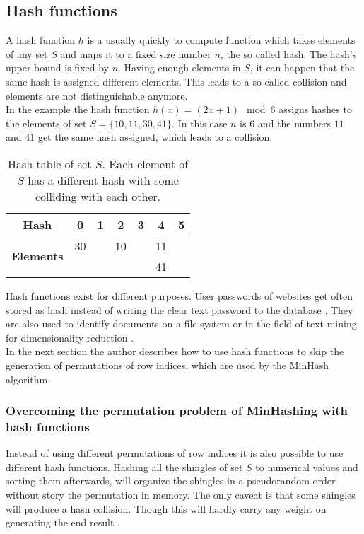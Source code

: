 \subsection{Hash functions}
A hash function $ h $ is a usually quickly to compute function which takes  elements of any set $ S $ and maps it to a fixed size number $ n $, the so called hash. The hash's upper bound is fixed by $ n $. Having enough elements in $ S $, it can happen that the same hash is assigned different elements. This leads to a so called collision and elements are not distinguishable anymore.\\


In the example the hash function $ h(x) = (2x+1) \mod 6 $ assigns hashes to the elements of set $ S = \{ 10,11,30,41 \} $.  In this case $ n $ is $ 6 $ and the numbers $ 11 $ and $ 41 $ get the same hash assigned, which leads to a collision.\\

\begin{table}[H]
    \centering
    \begin{tabular}{| c | c | c | c | c | c | c |}
        \hline
        \textbf{Hash} & \textbf{0} & \textbf{1} & \textbf{2} & \textbf{3} & \textbf{4} & \textbf{5}  \\
        \hline
        \multirow{2}{*}{\textbf{Elements}}   & 30 &    & 10 &    & 11 & \\
        &    &    &    &    & 41  &\\
        \hline
    \end{tabular}    
    \caption{Hash table of set $ S $. Each element of $ S $ has a different  hash with some colliding with each other.}
\end{table}

Hash functions exist for different purposes. User passwords of websites get often stored as hash instead of writing the clear text password to the database \cite{cryptographicHashFunctions}. They are also used to identify documents on a file system or in the field of text mining for dimensionality reduction \cite{practicalHashFunctions}.\\

In the next section the author describes how to use hash functions to skip the generation of permutations of row indices, which are used by the MinHash algorithm.\\

\subsubsection{Overcoming the permutation problem of MinHashing with hash functions} Instead of using different permutations of row indices it is also possible to use different hash functions. Hashing all the shingles of set $ S $ to numerical values and sorting them afterwards, will organize the shingles in a pseudorandom order without story the permutation in memory. The only caveat is that some shingles will produce a hash collision. Though this will hardly carry any weight on generating the end result \cite{minhash}.\\

